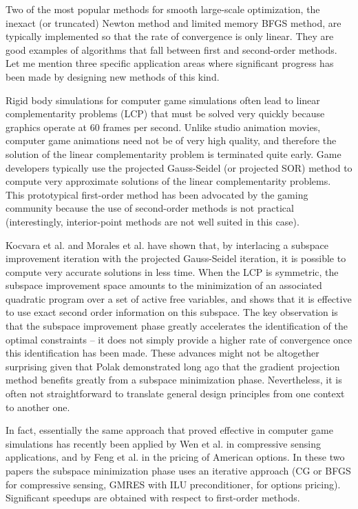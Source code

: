 \documentclass{optima}
\begin{document}
Two of the most popular methods for smooth large-scale optimization, the inexact (or
truncated) Newton method and limited memory BFGS method, are typically implemented so
that the rate of convergence is only linear. They are good examples of algorithms that
fall between first and second-order methods. Let me mention three specific application
areas where significant progress has been made by designing new methods of this kind.

Rigid body simulations for computer game simulations often lead to linear
complementarity problems (LCP) that must be solved very quickly because graphics
operate at 60 frames per second. Unlike studio animation movies, computer game
animations need not be of very high quality, and therefore the solution of the linear
complementarity problem is terminated quite early. Game developers typically use the
projected Gauss-Seidel (or projected SOR) method to compute very approximate solutions
of the linear complementarity problems. This prototypical first-order method has been
advocated by the gaming community because the use of second-order methods is not
practical (interestingly, interior-point methods are not well suited in this case).

Kocvara et al. \cite{KocZow94} and Morales et al. \cite{SmelMorNocedal} have shown
that, by interlacing a subspace improvement iteration with the projected Gauss-Seidel
iteration, it is possible to compute very accurate solutions in less time. When the
LCP is symmetric, the subspace improvement space amounts to the minimization of an
associated quadratic program over a set of active free variables, and
\cite{SmelMorNocedal} shows that it is effective to use exact second order information
on this subspace. The key observation is that the subspace improvement phase greatly
accelerates the identification of the optimal constraints -- it does not simply
provide a higher rate of convergence once this identification has been made. These
advances might not be altogether surprising given that Polak \cite{Poly69}
demonstrated long ago that the gradient projection method benefits greatly from a
subspace minimization phase. Nevertheless, it is often not straightforward to
translate general design principles from one context to another one.

In fact, essentially the same approach that proved effective in computer game
simulations has recently been applied by Wen et al. \cite{Zaiwenetal} in compressive
sensing applications, and by Feng et al. \cite{FengMoraNoceLinet} in the pricing of
American options. In these two papers the subspace minimization phase uses an
iterative approach (CG or BFGS for compressive sensing, GMRES with ILU preconditioner,
for options pricing). Significant speedups are obtained with respect to first-order
methods.
\end{document}
